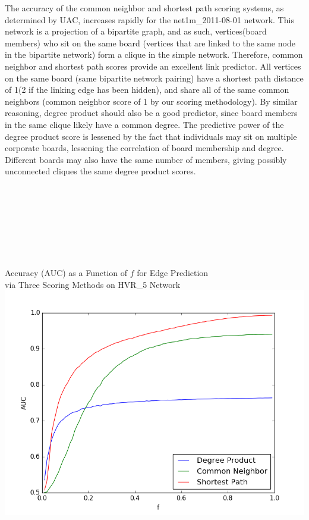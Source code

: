 \documentclass[11pt, oneside]{article}   	%
\begin{document}
\indent\indent The accuracy of the common neighbor and shortest path scoring systems, as determined by UAC, increases rapidly for the net1m\_2011-08-01 network.  This network is a projection of a bipartite graph, and as such, vertices(board members) who sit on the same board (vertices that are linked to the same node in the bipartite network) form a clique in the simple network.  Therefore, common neighbor and shortest path scores provide an excellent link predictor.  All vertices on the same board (same bipartite network pairing) have a shortest path distance of 1(2 if the linking edge has been hidden), and share all of the same common neighbors (common neighbor score of 1 by our scoring methodology).  By similar reasoning, degree product should also be a good predictor, since board members in the same clique likely have a common degree.  The predictive power of the degree product score is lessened by the fact that individuals may sit on multiple corporate boards, lessening the correlation of board membership and degree.  Different boards may also have the same number of members, giving possibly unconnected cliques the same degree product scores.\\\\\\\\\\\\\\\\
\begin{center}Accuracy (AUC) as a Function of $f$ for Edge Prediction\\via Three Scoring Methods on HVR\_5 Network \includegraphics[scale=0.5]{predictEdgesHVR_520Iterations.png}\end{center}
\end{document}
